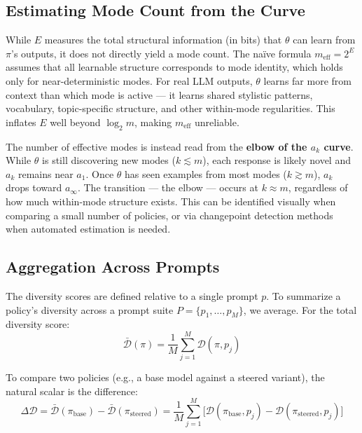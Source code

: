 \documentclass[11pt]{article}
\begin{document}
\subsection{Estimating Mode Count from the Curve}\label{sec:mode-count-from-curve}

While $E$ measures the total structural information (in bits) that $\theta$ can learn from $\pi$'s outputs, it does not directly yield a mode count. The na\"ive formula $m_{\mathrm{eff}} = 2^{E}$ assumes that all learnable structure corresponds to mode identity, which holds only for near-deterministic modes. For real LLM outputs, $\theta$ learns far more from context than which mode is active --- it learns shared stylistic patterns, vocabulary, topic-specific structure, and other within-mode regularities. This inflates $E$ well beyond $\log_2 m$, making $m_{\mathrm{eff}}$ unreliable.

The number of effective modes is instead read from the \textbf{elbow of the $a_k$ curve}. While $\theta$ is still discovering new modes ($k \lesssim m$), each response is likely novel and $a_k$ remains near $a_1$. Once $\theta$ has seen examples from most modes ($k \gtrsim m$), $a_k$ drops toward $a_\infty$. The transition --- the elbow --- occurs at $k \approx m$, regardless of how much within-mode structure exists. This can be identified visually when comparing a small number of policies, or via changepoint detection methods when automated estimation is needed.

\subsection{Aggregation Across Prompts}\label{sec:aggregation}

The diversity scores are defined relative to a single prompt $p$. To summarize a policy's diversity across a prompt suite $P = \{p_1, \ldots, p_M\}$, we average. For the total diversity score:
\begin{equation}
    \bar{\mathcal{D}}(\pi) = \frac{1}{M}\sum_{j=1}^{M} \mathcal{D}(\pi, p_j)
\end{equation}

To compare two policies (e.g., a base model against a steered variant), the natural scalar is the difference:
\begin{equation}
    \Delta\mathcal{D} = \bar{\mathcal{D}}(\pi_{\mathrm{base}}) - \bar{\mathcal{D}}(\pi_{\mathrm{steered}}) = \frac{1}{M}\sum_{j=1}^{M}\bigl[\mathcal{D}(\pi_{\mathrm{base}}, p_j) - \mathcal{D}(\pi_{\mathrm{steered}}, p_j)\bigr]
\end{equation}
\end{document}
